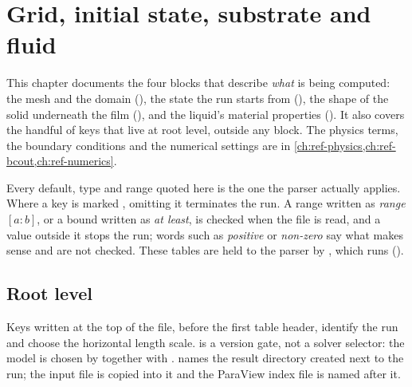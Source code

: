 \chapter{Grid, initial state, substrate and fluid}
\label{ch:ref-domain}

This chapter documents the four blocks that describe \emph{what} is being
computed: the mesh and the domain (), the state the run starts from
(), the shape of the solid underneath the film
(), and the liquid's material properties (). It also
covers the handful of keys that live at root level, outside any block. The
physics terms, the boundary conditions and the numerical settings are in
\cref{ch:ref-physics,ch:ref-bcout,ch:ref-numerics}.

Every default, type and range quoted here is the one the parser actually
applies. Where a key is marked \reqd{}, omitting it terminates the run. A
range written as \emph{range $[a:b]$}, or a bound written as \emph{at least},
is checked when the file is read, and a value outside it stops the run; words
such as \emph{positive} or \emph{non-zero} say what makes sense and are not
checked. These tables are held to the parser by ,
which  runs ().

\section{Root level}
\label{sec:ref-domain:root}

Keys written at the top of the file, before the first table header, identify
the run and choose the horizontal length scale.  is a version gate,
not a solver selector: the model is chosen by 
together with .  names the result directory
created next to the run; the input file is copied into it and the ParaView
index file is named after it.

